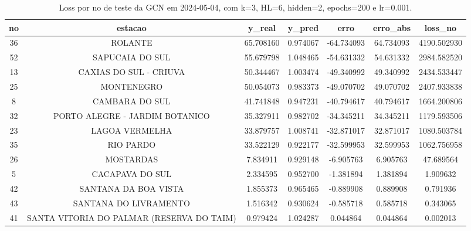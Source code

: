 \begin{table}[h]
\centering
\caption{Loss por no de teste da GCN em 2024-05-04, com k=3, HL=6, hidden=2, epochs=200 e lr=0.001.}
\label{tab:gcn_loss_k3_hl6_h2_e200_d20240504}
\begin{tabular}{ccccccc}
\toprule
no & estacao & y\_real & y\_pred & erro & erro\_abs & loss\_no \\
\midrule
36 & ROLANTE & 65.708160 & 0.974067 & -64.734093 & 64.734093 & 4190.502930 \\
52 & SAPUCAIA DO SUL & 55.679798 & 1.048465 & -54.631332 & 54.631332 & 2984.582520 \\
13 & CAXIAS DO SUL - CRIUVA & 50.344467 & 1.003474 & -49.340992 & 49.340992 & 2434.533447 \\
25 & MONTENEGRO & 50.054073 & 0.983373 & -49.070702 & 49.070702 & 2407.933838 \\
8 & CAMBARA DO SUL & 41.741848 & 0.947231 & -40.794617 & 40.794617 & 1664.200806 \\
32 & PORTO ALEGRE - JARDIM BOTANICO & 35.327911 & 0.982702 & -34.345211 & 34.345211 & 1179.593506 \\
23 & LAGOA VERMELHA & 33.879757 & 1.008741 & -32.871017 & 32.871017 & 1080.503784 \\
35 & RIO PARDO & 33.522129 & 0.922177 & -32.599953 & 32.599953 & 1062.756958 \\
26 & MOSTARDAS & 7.834911 & 0.929148 & -6.905763 & 6.905763 & 47.689564 \\
5 & CACAPAVA DO SUL & 2.334595 & 0.952700 & -1.381894 & 1.381894 & 1.909632 \\
42 & SANTANA DA BOA VISTA & 1.855373 & 0.965465 & -0.889908 & 0.889908 & 0.791936 \\
43 & SANTANA DO LIVRAMENTO & 1.516342 & 0.930624 & -0.585718 & 0.585718 & 0.343065 \\
41 & SANTA VITORIA DO PALMAR (RESERVA DO TAIM) & 0.979424 & 1.024287 & 0.044864 & 0.044864 & 0.002013 \\
\bottomrule
\end{tabular}
\end{table}
